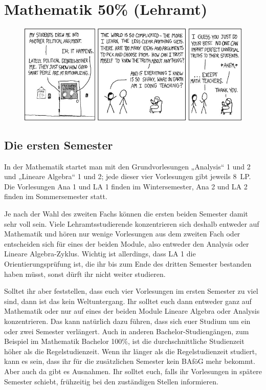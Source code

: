 \section{Mathematik 50\% (Lehramt)}

\begin{figure}[b]
\centering
\includegraphics[width=\textwidth]{bilder/certainty.jpg}
\end{figure}

\subsection{Die ersten Semester}

In der Mathematik startet man mit den Grundvorlesungen „Analysis“ 1 und 2 und „Lineare Algebra“ 1 und 2; jede dieser vier Vorlesungen gibt jeweils 8~\gls{LP}. Die Vorlesungen Ana 1 und LA 1 finden im Wintersemester, Ana 2 und LA 2 finden im Sommersemester statt. 

Je nach der Wahl des zweiten Fachs können die ersten beiden Semester damit sehr voll sein. Viele Lehramtsstudierende konzentrieren sich deshalb entweder auf Mathematik und hören nur wenige Vorlesungen aus dem zweiten Fach oder entscheiden sich für eines der beiden Module, also entweder den Analysis oder Lineare Algebra-Zyklus. Wichtig ist allerdings, dass LA 1 die Orientierungsprüfung ist, die ihr bis zum Ende des dritten Semester bestanden haben müsst, sonst dürft ihr nicht weiter studieren.

Solltet ihr aber feststellen, dass euch vier Vorlesungen im ersten Semester zu viel sind, dann ist das kein Weltuntergang. Ihr solltet euch dann entweder ganz auf Mathematik oder nur auf eines der beiden Module Lineare Algebra oder Analysis konzentrieren. Das kann natürlich dazu führen, dass sich euer Studium um ein oder zwei Semester verlängert. Auch in anderen Bachelor-Studiengängen, zum Beispiel im Mathematik Bachelor 100\%, ist die durchschnittliche Studienzeit höher als die Regelstudienzeit. Wenn ihr länger als die Regelstudienzeit studiert, kann es sein, dass ihr für die zusätzlichen Semester kein BAföG mehr bekommt. Aber auch da gibt es Ausnahmen. Ihr solltet euch, falls ihr Vorlesungen in spätere Semester schiebt, frühzeitig bei den zuständigen Stellen informieren.

